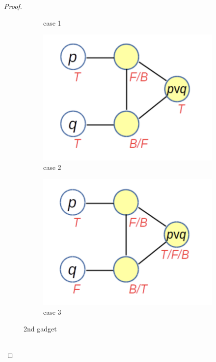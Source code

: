 \documentclass[12pt]{article}
\begin{document}
\begin{proof}
\begin{figure}[h]
\begin{subfigure}[b]{0.3\textwidth}
        \caption{case 1}
        \label{fig:img1}
    \end{subfigure}
    \hfill
    \begin{subfigure}[b]{0.3\textwidth}
        \includegraphics[width=\textwidth]{img/3-coloring-2g2.png}
        \caption{case 2}
        \label{fig:img2}
    \end{subfigure}
    \hfill
    \begin{subfigure}[b]{0.3\textwidth}
        \includegraphics[width=\textwidth]{img/3-coloring-2g3.png}
        \caption{case 3}
        \label{fig:img3}
    \end{subfigure}
    \caption{2nd gadget}
    \label{fig:images}
\end{figure}
\\

\end{proof}
\end{document}
